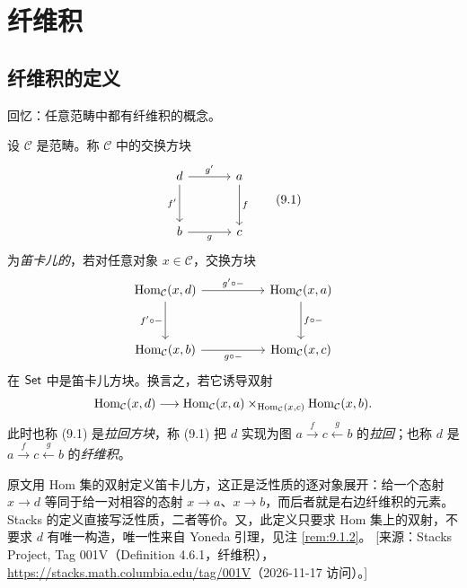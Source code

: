 
\section{纤维积}\label{sec:9}

\subsection{纤维积的定义}\label{sec:9.1}

回忆：任意范畴中都有纤维积的概念。

\begin{definition}\label{def:9.1.1}
设 $\mathcal C$ 是范畴。称 $\mathcal C$ 中的交换方块
\[
\begin{tikzcd}[column sep=3.4em,row sep=3em]
d \arrow[r,"g'"] \arrow[d,"f'"'] & a \arrow[d,"f"]\\
b \arrow[r,"g"'] & c
\end{tikzcd}
\tag{9.1}
\]
为\emph{笛卡儿的}，若对任意对象 $x \in \mathcal C$，交换方块
\[
\begin{tikzcd}[column sep=5em,row sep=3em]
\Hom_{\mathcal C}(x,d) \arrow[r,"g'\circ-"] \arrow[d,"f'\circ-"'] & \Hom_{\mathcal C}(x,a) \arrow[d,"f\circ-"]\\
\Hom_{\mathcal C}(x,b) \arrow[r,"g\circ-"'] & \Hom_{\mathcal C}(x,c)
\end{tikzcd}
\]
在 $\mathsf{Set}$ 中是笛卡儿方块。换言之，若它诱导双射
\[
\operatorname{Hom}_{\mathcal C}(x,d) \longrightarrow \operatorname{Hom}_{\mathcal C}(x,a) \times_{\operatorname{Hom}_{\mathcal C}(x,c)} \operatorname{Hom}_{\mathcal C}(x,b).
\]
此时也称 (9.1) 是\emph{拉回方块}，称 (9.1) 把 $d$ 实现为图 $a \xrightarrow{f} c \xleftarrow{g} b$ 的\emph{拉回}；也称 $d$ 是 $a \xrightarrow{f} c \xleftarrow{g} b$ 的\emph{纤维积}。
\end{definition}

\begin{yizhu}
原文用 Hom 集的双射定义笛卡儿方，这正是泛性质的逐对象展开：给一个态射 $x \to d$ 等同于给一对相容的态射 $x \to a$、$x \to b$，而后者就是右边纤维积的元素。Stacks 的定义直接写泛性质，二者等价。又，此定义只要求 Hom 集上的双射，不要求 $d$ 有唯一构造，唯一性来自 Yoneda 引理，见注 \ref{rem:9.1.2}。
[来源：Stacks Project, Tag 001V（Definition 4.6.1，纤维积），\url{https://stacks.math.columbia.edu/tag/001V}（2026-11-17 访问）。]
\end{yizhu}

